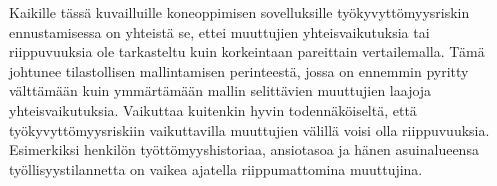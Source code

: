 Kaikille tässä kuvailluille koneoppimisen sovelluksille työkyvyttömyysriskin ennustamisessa on yhteistä se, ettei muuttujien yhteisvaikutuksia tai riippuvuuksia ole tarkasteltu kuin korkeintaan pareittain vertailemalla. Tämä johtunee tilastollisen mallintamisen perinteestä, jossa on ennemmin pyritty välttämään kuin ymmärtämään mallin selittävien muuttujien laajoja yhteisvaikutuksia. Vaikuttaa kuitenkin hyvin todennäköiseltä, että työkyvyttömyysriskiin vaikuttavilla muuttujien välillä voisi olla riippuvuuksia. Esimerkiksi henkilön työttömyyshistoriaa, ansiotasoa ja hänen asuinalueensa työllisyystilannetta on vaikea ajatella riippumattomina muuttujina.



